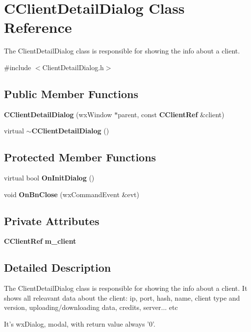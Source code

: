 \section{CClientDetailDialog Class Reference}
\label{classCClientDetailDialog}


The ClientDetailDialog class is responsible for showing the info about a client.  


{\ttfamily \#include $<$ClientDetailDialog.h$>$}\subsection*{Public Member Functions}
\begin{DoxyCompactItemize}
\item 
{\bf CClientDetailDialog} (wxWindow $\ast$parent, const {\bf CClientRef} \&client)
\item 
virtual {\bf $\sim$CClientDetailDialog} ()
\end{DoxyCompactItemize}
\subsection*{Protected Member Functions}
\begin{DoxyCompactItemize}
\item 
virtual bool {\bf OnInitDialog} ()
\item 
void {\bf OnBnClose} (wxCommandEvent \&evt)
\end{DoxyCompactItemize}
\subsection*{Private Attributes}
\begin{DoxyCompactItemize}
\item 
{\bf CClientRef} {\bf m\_\-client}\label{classCClientDetailDialog_a5a1dda08c572524a7de1abe30fece5a1}

\end{DoxyCompactItemize}


\subsection{Detailed Description}
The ClientDetailDialog class is responsible for showing the info about a client. It shows all releavant data about the client: ip, port, hash, name, client type and version, uploading/downloading data, credits, server... etc

It's wxDialog, modal, with return value always '0'. 

